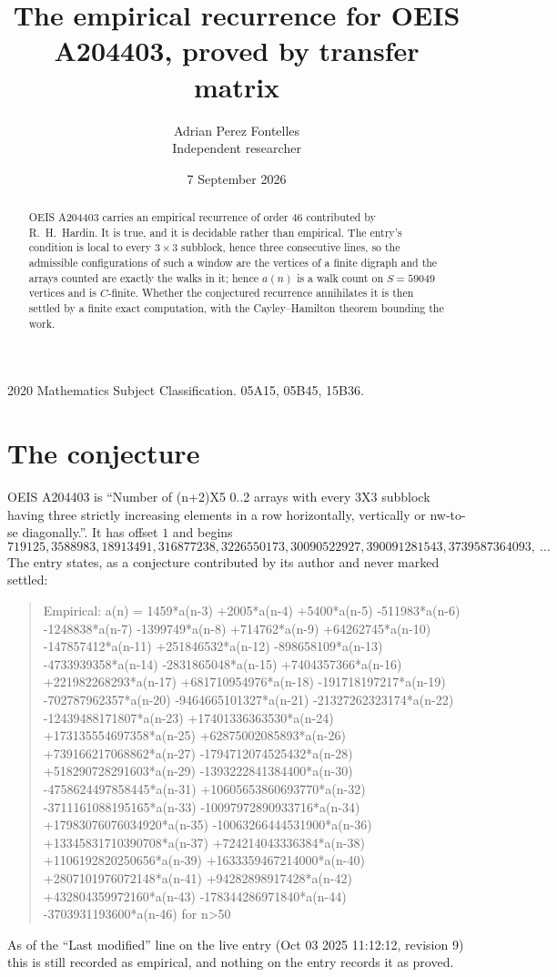 \documentclass[11pt,a4paper]{article}
\title{The empirical recurrence for OEIS A204403, proved by transfer matrix}
\author{Adrian Perez Fontelles\\ \small Independent researcher}
\date{7 September 2026}
\theoremstyle{plain}
\theoremstyle{definition}
\begin{document}
\maketitle

\begin{abstract}
OEIS A204403 carries an empirical recurrence of order $46$ contributed by R.~H.~Hardin. It is
true, and it is decidable rather than empirical. The entry's condition is local to every $3\times3$ subblock, hence three consecutive lines, so
the admissible configurations of such a window are the vertices of a finite digraph and the
arrays counted are exactly the walks in it; hence $a(n)$ is a walk count on $S=59049$ vertices
and is $C$-finite. Whether the conjectured recurrence annihilates it is then settled by a
finite exact computation, with the Cayley--Hamilton theorem bounding the work.
\end{abstract}

\noindent\small 2020 Mathematics Subject Classification. 05A15, 05B45, 15B36.\normalsize

\section{The conjecture}

OEIS A204403 is ``Number of (n+2)X5 0..2 arrays with every 3X3 subblock having three strictly increasing elements in a row horizontally, vertically or nw-to-se diagonally.''. It has offset $1$ and begins
\[
719125, 3588983, 18913491, 316877238, 3226550173, 30090522927, 390091281543, 3739587364093,\ \dots
\]
The entry states, as a conjecture contributed by its author and never marked settled:
\begin{quote}
Empirical: a(n) = 1459*a(n-3) +2005*a(n-4) +5400*a(n-5) -511983*a(n-6) -1248838*a(n-7) -1399749*a(n-8) +714762*a(n-9) +64262745*a(n-10) -147857412*a(n-11) +251846532*a(n-12) -898658109*a(n-13) -4733939358*a(n-14) -2831865048*a(n-15) +7404357366*a(n-16) +221982268293*a(n-17) +681710954976*a(n-18) -191718197217*a(n-19) -702787962357*a(n-20) -9464665101327*a(n-21) -21327262323174*a(n-22) -12439488171807*a(n-23) +17401336363530*a(n-24) +173135554697358*a(n-25) +62875002085893*a(n-26) +739166217068862*a(n-27) -1794712074525432*a(n-28) +518290728291603*a(n-29) -1393222841384400*a(n-30) -4758624497858445*a(n-31) +10605653860693770*a(n-32) -3711161088195165*a(n-33) -10097972890933716*a(n-34) +17983076076034920*a(n-35) -10063266444531900*a(n-36) +13345831710390708*a(n-37) +724214043336384*a(n-38) +1106192820250656*a(n-39) +1633359467214000*a(n-40) +2807101976072148*a(n-41) +94282898917428*a(n-42) +432804359972160*a(n-43) -178344286971840*a(n-44) -3703931193600*a(n-46) for n>50
\end{quote}
As of the ``Last modified'' line on the live entry (Oct 03 2025 11:12:12, revision 9) this is still
recorded as empirical, and nothing on the entry records it as proved.
\end{document}

